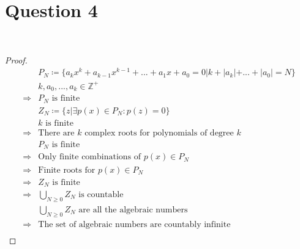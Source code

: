 \documentclass{article}
\begin{document}
\newpage

\section*{Question 4}

~

\begin{proof}
    \begin{align*}
        &P_N\coloneqq \{a_kx^k+a_{k-1}x^{k-1}+...+a_1x+a_0=0|k+|a_k|+...+|a_0|=N\}\\
        &k,a_0,...,a_k\in\mathbb{Z}^+\\
        \Rightarrow&P_N\text{ is finite}\\
        &Z_N\coloneqq \{z|\exists p(x)\in P_N:p(z)=0\}\\
        &k\text{ is finite}\\
        \Rightarrow&\text{There are }k\text{ complex roots for polynomials of degree }k\\
        &P_N\text{ is finite}\\
        \Rightarrow&\text{Only finite combinations of }p(x)\in P_N\\
        \Rightarrow&\text{Finite roots for }p(x)\in P_N\\
        \Rightarrow&Z_N\text{ is finite}\\
        \Rightarrow&\bigcup_{N\geqslant 0}Z_N\text{ is countable}\\
        &\bigcup_{N\geqslant0}Z_N\text{ are all the algebraic numbers}\\
        \Rightarrow&\text{The set of algebraic numbers are countably infinite}\\
    \end{align*}
\end{proof}
\end{document}

